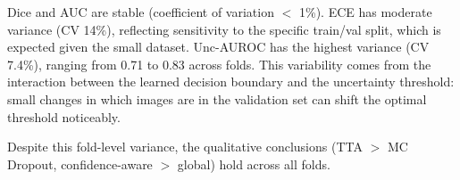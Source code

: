 \begin{table}[H]
\centering
\caption{Five-fold cross-validation results on DRIVE (mean $\pm$ std).
Low variance across folds indicates stable training and evaluation.}
\label{tab:cv}
\small
\setlength{\tabcolsep}{4.6pt}
\end{table}

Dice and AUC are stable (coefficient of variation $<$ 1\%). ECE has moderate
variance (CV 14\%), reflecting sensitivity to the specific train/val split,
which is expected given the small dataset. Unc-AUROC has the highest
variance (CV 7.4\%), ranging from 0.71 to 0.83 across folds. This
variability comes from the interaction between the learned decision
boundary and the uncertainty threshold: small changes in which images
are in the validation set can shift the optimal threshold noticeably.

Despite this fold-level variance, the qualitative conclusions (TTA $>$ MC
Dropout, confidence-aware $>$ global) hold across all folds.
